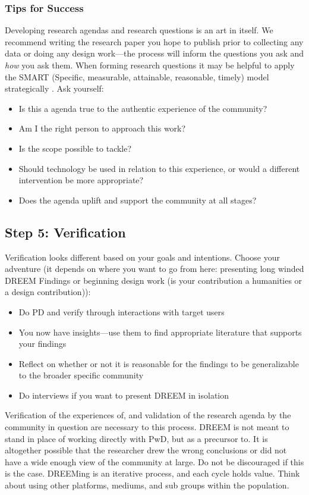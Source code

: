 \subsubsection{Tips for Success}
Developing research agendas and research questions is an art in itself. We recommend writing the research paper you hope to publish prior to collecting any data or doing any design work—the process will inform the questions you ask and \textit{how} you ask them. When forming research questions it may be helpful to apply the SMART (Specific, measurable, attainable, reasonable, timely) model strategically \cite{fieldingTargetSettingPolicy1999}. Ask yourself:
\begin{itemize}
\item Is this a agenda true to the authentic experience of the community?
\item Am I the right person to approach this work? 
\item Is the scope possible to tackle?
\item Should technology be used in relation to this experience, or would a different intervention be more appropriate?
\item Does the agenda uplift and support the community at all stages?
\end{itemize}

\subsection{Step 5: Verification}
Verification looks different based on your goals and intentions. 
Choose your adventure (it depends on where you want to go from here: presenting long winded DREEM Findings or beginning design work (is your contribution a humanities or a design contribution)):
\begin{itemize}
\item Do PD and verify through interactions with target users
\item You now have insights—use them to find appropriate literature that supports your findings
\item Reflect on whether or not it is reasonable for the findings to be generalizable to the broader specific community
\item Do interviews if you want to present DREEM in isolation
\end{itemize}

Verification of the experiences of, and validation of the research agenda by the community in question are necessary to this process. DREEM is not meant to stand in place of working directly with PwD, but as a precursor to. It is altogether possible that the researcher drew the wrong conclusions or did not have a wide enough view of the community at large. Do not be discouraged if this is the case. DREEMing is an iterative process, and each cycle holds value.
Think about using other platforms, mediums, and sub groups within the population. 

